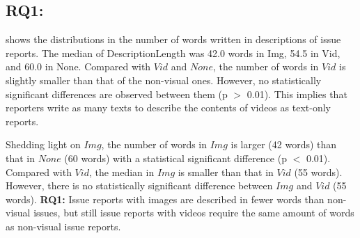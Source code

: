 % 



\subsection*{RQ1: \RQone{}}

 shows the distributions in the number of words written in descriptions of issue reports. The median of DescriptionLength was 42.0 words in Img, 54.5 in Vid, and 60.0 in None. 
Compared with $Vid$ and $None$, the number of words in $Vid$ is slightly smaller than that of the non-visual ones. However, no statistically significant differences are observed between them (p $>$ 0.01). This implies that reporters write as many texts to describe the contents of videos as text-only reports. 

Shedding light on $Img$, the number of words in $Img$ is larger (42 words) than 
that in $None$ (60 words) with a statistical significant difference (p $<$ 0.01). Compared with $Vid$, the median in $Img$ is smaller than that in $Vid$ (55 words). However, there is no statistically significant difference between $Img$ and $Vid$ (55 words).%
\summarybox
{
{\bf RQ1: }{Issue reports with images are described in fewer words than non-visual issues, but still issue reports with videos require the same amount of words as non-visual issue reports. 
}}

